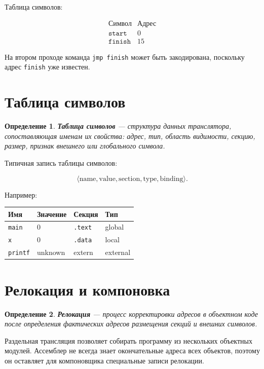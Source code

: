 \documentclass[12pt,a4paper]{article}
\newtheorem{definition}{Определение}
\begin{document}
Таблица символов:

\[
\begin{array}{c|c}
\text{Символ} & \text{Адрес} \\
\hline
\texttt{start} & 0 \\
\texttt{finish} & 15
\end{array}
\]

На втором проходе команда \texttt{jmp finish} может быть закодирована, поскольку адрес \texttt{finish} уже известен.

\section{Таблица символов}

\begin{definition}
\textbf{Таблица символов} --- структура данных транслятора, сопоставляющая именам их свойства: адрес, тип, область видимости, секцию, размер, признак внешнего или глобального символа.
\end{definition}

Типичная запись таблицы символов:

\[
\langle
\text{name},
\text{value},
\text{section},
\text{type},
\text{binding}
\rangle.
\]

Например:

\begin{center}
\begin{tabular}{llll}
\toprule
Имя & Значение & Секция & Тип \\
\midrule
\texttt{main} & 0 & \texttt{.text} & global \\
\texttt{x} & 0 & \texttt{.data} & local \\
\texttt{printf} & unknown & extern & external \\
\bottomrule
\end{tabular}
\end{center}

\section{Релокация и компоновка}

\begin{definition}
\textbf{Релокация} --- процесс корректировки адресов в объектном коде после определения фактических адресов размещения секций и внешних символов.
\end{definition}

Раздельная трансляция позволяет собирать программу из нескольких объектных модулей. Ассемблер не всегда знает окончательные адреса всех объектов, поэтому он оставляет для компоновщика специальные записи релокации.
\end{document}
